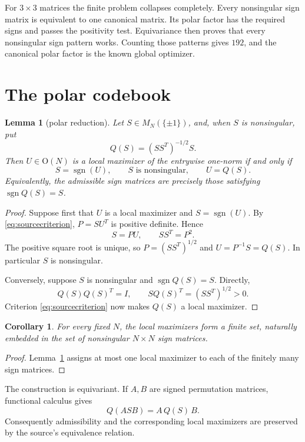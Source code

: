 \documentclass[11pt]{article}
\newtheorem{lemma}[theorem]{Lemma}
\newtheorem{corollary}[theorem]{Corollary}
\newcommand{\sgn}{\operatorname{sgn}}
\newcommand{\OO}{\mathrm O}
\begin{document}
For \(3\times3\) matrices the finite problem collapses completely. Every
nonsingular sign matrix is equivalent to one canonical matrix. Its polar
factor has the required signs and passes the positivity test. Equivariance
then proves that every nonsingular sign pattern works. Counting those
patterns gives \(192\), and the canonical polar factor is the known global
optimizer.

\section{The polar codebook}

\begin{lemma}[polar reduction]\label{lem:polar}
Let \(S\in M_N(\{\pm1\})\), and, when \(S\) is nonsingular, put
\[
 Q(S)=(SS^T)^{-1/2}S.
\]
Then \(U\in\OO(N)\) is a local maximizer of the entrywise one-norm if and
only if
\[
 S=\sgn(U),\qquad S\text{ is nonsingular},\qquad U=Q(S).
\]
Equivalently, the admissible sign matrices are precisely those satisfying
\(\sgn Q(S)=S\).
\end{lemma}

\begin{proof}
Suppose first that \(U\) is a local maximizer and \(S=\sgn(U)\).
By \eqref{eq:sourcecriterion}, \(P=SU^T\) is positive definite. Hence
\[
 S=PU,\qquad SS^T=P^2.
\]
The positive square root is unique, so \(P=(SS^T)^{1/2}\) and
\(U=P^{-1}S=Q(S)\). In particular \(S\) is nonsingular.

Conversely, suppose \(S\) is nonsingular and \(\sgn Q(S)=S\). Directly,
\[
 Q(S)Q(S)^T=I,\qquad
 S Q(S)^T=(SS^T)^{1/2}>0.
\]
Criterion \eqref{eq:sourcecriterion} now makes \(Q(S)\) a local maximizer.
\end{proof}

\begin{corollary}\label{cor:finite}
For every fixed \(N\), the local maximizers form a finite set, naturally
embedded in the set of nonsingular \(N\times N\) sign matrices.
\end{corollary}

\begin{proof}
Lemma~\ref{lem:polar} assigns at most one local maximizer to each of the
finitely many sign matrices.
\end{proof}

The construction is equivariant. If \(A,B\) are signed permutation matrices,
functional calculus gives
\begin{equation}\label{eq:equivariance}
 Q(ASB)=A\,Q(S)\,B.
\end{equation}
Consequently admissibility and the corresponding local maximizers are
preserved by the source's equivalence relation.
\end{document}
